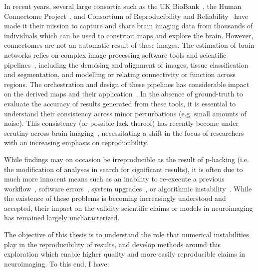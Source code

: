 In recent years, several large consortia such as the UK BioBank~\cite{sudlow2015uk}, the Human Connectome
Project~\cite{van2013wu}, and Consortium of Reproducibility and Reliability~\cite{zuo2014open} have made it their
mission to capture and share brain imaging data from thousands of individuals which can be used to construct maps and
explore the brain. However, connectomes are not an automatic result of these images. The estimation of brain networks
relies on complex image processing software tools and scientific
pipelines~\cite{hagmann2005diffusion,esteban2019fmriprep}, including the denoising and alignment of images, tissue
classification and segmentation, and modelling or relating connectivity or function across regions. The orchestration
and design of these pipelines has considerable impact on the derived maps and their
application~\cite{bowring2019exploring,klein2009evaluation}. In the absence of ground-truth to evaluate the accuracy of
results generated from these tools, it is essential to understand their consistency across minor perturbations (e.g.
small amounts of noise). This consistency (or possible lack thereof) has recently become under scrutiny across brain
imaging~\cite{glatard2015reproducibility,Lewis2017-ll,eklund2016cluster}, necessitating a shift in the focus of
researchers with an increasing emphasis on reproducibility.

While findings may on occasion be irreproducible as the result of p-hacking (i.e. the modification of analyses in
search for significant results), it is often due to much more innocent means such as an inability to re-execute a
previous workflow~\cite{collberg2016repeatability}, software errors~\cite{eklund2016cluster}, system
upgrades~\cite{salari2020file}, or algorithmic instability~\cite{Lewis2017-ll}. While the existence of these problems
is becoming increasingly understood and accepted, their impact on the validity scientific claims or models in
neuroimaging has remained largely uncharacterized.

The objective of this thesis is to understand the role that numerical instabilities play in the reproducibility of
results, and develop methods around this exploration which enable higher quality and more easily reproducible claims
in neuroimaging. To this end, I have:

